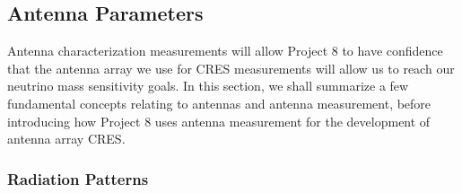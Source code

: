 \subsection{Antenna Parameters}
\label{sec:ant-meas-fun}

Antenna characterization measurements will allow Project 8 to have confidence that the antenna array we use for CRES measurements will allow us to reach our neutrino mass sensitivity goals. In this section, we shall summarize a few fundamental concepts relating to antennas and antenna measurement, before introducing how Project 8 uses antenna measurement for the development of antenna array CRES.

\subsubsection{Radiation Patterns}

